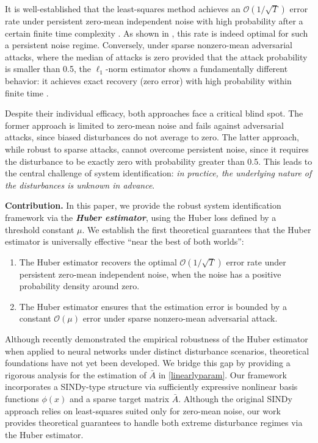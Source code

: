 \documentclass[letterpaper,10pt,conference]{ieeeconf}
\theoremstyle{plain} %
\theoremstyle{plain} %
\theoremstyle{plain} %
\theoremstyle{plain}
\begin{document}
It is well-established that the least-squares method achieves an $\mathcal{O}(1/\sqrt{T})$ error rate under persistent zero-mean independent noise with high probability after a certain finite time complexity \cite{simchowitz2018learning, jedra2020finite}. As shown in  \cite{simchowitz2018learning}, this rate is indeed optimal for such a persistent noise regime. 
Conversely, under sparse nonzero-mean adversarial attacks, where the median of attacks is zero provided that the attack probability is smaller than 0.5, the $\ell_1$-norm estimator shows a  fundamentally different behavior: it achieves exact recovery (zero error) with high probability within  finite time  \cite{kim2024prevailing}.


Despite their individual efficacy, both approaches face a critical blind spot. 
The former approach is limited to zero-mean noise and fails against adversarial attacks, since biased disturbances do not average to zero. The latter approach, while robust to sparse attacks, cannot overcome persistent noise, since it  requires the disturbance to be exactly zero with probability greater than 0.5. This leads to the central challenge of system identification:  \textit{in practice, the underlying nature of the disturbances is unknown in advance}. 




\textbf{Contribution. } In this paper, we provide the robust system identification framework  via the \textbf{\textit{Huber estimator}}, using the Huber loss \cite{huber1964robust} defined by a threshold constant $\mu$. We establish the first theoretical guarantees that the Huber estimator is universally effective ``near the best of both worlds'':
\begin{enumerate}[leftmargin=0.5cm]
    \item The Huber estimator recovers the optimal $\mathcal{O}(1/\sqrt{T})$ error rate under persistent zero-mean independent noise, when the noise has a positive probability density around zero. 
    \item The Huber estimator ensures that the estimation error is bounded by a constant $\mathcal{O}(\mu)$ error under sparse nonzero-mean adversarial attack. 
\end{enumerate}


Although \cite{kumar2025machine} recently demonstrated the empirical robustness of  the Huber estimator when applied to neural networks under distinct disturbance scenarios,  theoretical foundations have not yet been developed. We bridge this gap by providing a rigorous analysis for the estimation of $\bar A$ in \eqref{linearlyparam}. Our framework incorporates a SINDy-type structure \cite{brunton2016discovering} via sufficiently expressive nonlinear basis functions $\phi(x)$ and a sparse target matrix $\bar A$. Although the original SINDy approach relies on  least-squares suited only for zero-mean noise, our work provides theoretical guarantees to handle both extreme disturbance regimes via the Huber estimator.
\end{document}
